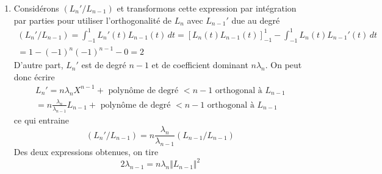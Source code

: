 \begin{enumerate}
 \item Considérons $(L_n'/L_{n-1})$ et transformons cette expression par intégration par parties pour utiliser l'orthogonalité de $L_n$ avec $L_{n-1}'$ due au degré 
\begin{multline*}
 (L_n'/L_{n-1})=\int_{-1}^1L_n'(t)L_{n-1}(t)\,dt
=\left[L_n(t)L_{n-1}(t) \right]_{-1}^1- \int_{-1}^1L_n(t)L_{n-1}'(t)\,dt\\
=1 - (-1)^{n}(-1)^{n-1}-0=2
\end{multline*}
D'autre part, $L_n'$ est de degré $n-1$ et de coefficient dominant $n\lambda_n$. On peut donc écrire
\begin{multline*}
 L_n'= n\lambda_n X^{n-1} + \text{ polynôme de degré $< n-1$ orthogonal à $L_{n-1}$}\\
 = n \frac{\lambda_n}{\lambda_{n-1}}L_{n-1}+\text{ polynôme de degré $< n-1$ orthogonal à $L_{n-1}$}
\end{multline*}
ce qui entraine
\begin{displaymath}
 (L_n'/L_{n-1})=n \frac{\lambda_n}{\lambda_{n-1}}(L_{n-1}/L_{n-1})
\end{displaymath}
Des deux expressions obtenues, on tire
\begin{displaymath}
 2\lambda_{n-1}=n\lambda_n\Vert L_{n-1}\Vert^2
\end{displaymath}


\end{enumerate}
